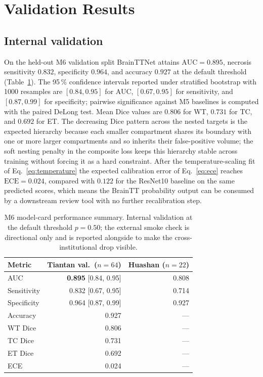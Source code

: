 \documentclass[11pt,a4paper]{article}
\begin{document}
\section{Validation Results}

\subsection{Internal validation}

On the held-out M6 validation split BrainTTNet attains $\text{AUC}=0.895$, necrosis sensitivity $0.832$, specificity $0.964$, and accuracy $0.927$ at the default threshold (Table~\ref{tab:m6perf}). The 95\,\% confidence intervals reported under stratified bootstrap with 1000 resamples are $[0.84, 0.95]$ for AUC, $[0.67, 0.95]$ for sensitivity, and $[0.87, 0.99]$ for specificity; pairwise significance against M5 baselines is computed with the paired DeLong test. Mean Dice values are $0.806$ for WT, $0.731$ for TC, and $0.692$ for ET. The decreasing Dice pattern across the nested targets is the expected hierarchy because each smaller compartment shares its boundary with one or more larger compartments and so inherits their false-positive volume; the soft nesting penalty in the composite loss keeps this hierarchy stable across training without forcing it as a hard constraint. After the temperature-scaling fit of Eq.~\eqref{eq:temperature} the expected calibration error of Eq.~\eqref{eq:ece} reaches $\text{ECE} = 0.024$, compared with $0.122$ for the ResNet10 baseline on the same predicted scores, which means the BrainTT probability output can be consumed by a downstream review tool with no further recalibration step.

\begin{table}[t]
\centering
\caption{M6 model-card performance summary. Internal validation at the default threshold $p=0.50$; the external smoke check is directional only and is reported alongside to make the cross-institutional drop visible.}
\label{tab:m6perf}
\small
\begin{tabular}{lrr}
\toprule
Metric & Tiantan val.\ ($n=64$) & Huashan ($n=22$) \\
\midrule
AUC & \textbf{0.895} [0.84, 0.95] & 0.808 \\
Sensitivity & 0.832 [0.67, 0.95] & 0.714 \\
Specificity & 0.964 [0.87, 0.99] & 0.927 \\
Accuracy & 0.927 & --- \\
WT Dice & 0.806 & --- \\
TC Dice & 0.731 & --- \\
ET Dice & 0.692 & --- \\
ECE & 0.024 & --- \\
\bottomrule
\end{tabular}
\end{table}
\end{document}
